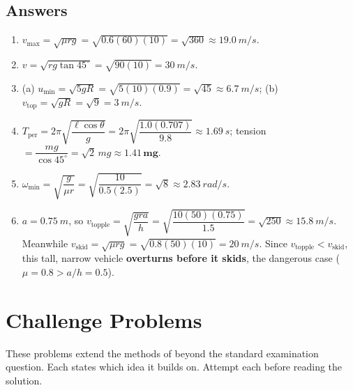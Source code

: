\subsection*{Answers}
{\small
\begin{enumerate}[itemsep=2pt]
\item $v_{\max}=\sqrt{\mu rg}=\sqrt{0.6(60)(10)}=\sqrt{360}\approx\SI{19.0}{m/s}$.
\item $v=\sqrt{rg\tan45^\circ}=\sqrt{90(10)}=\SI{30}{m/s}$.
\item (a) $u_{\min}=\sqrt{5gR}=\sqrt{5(10)(0.9)}=\sqrt{45}\approx\SI{6.7}{m/s}$;
(b) $v_{\text{top}}=\sqrt{gR}=\sqrt{9}=\SI{3}{m/s}$.
\item $T_{\text{per}}=2\pi\sqrt{\dfrac{\ell\cos\theta}{g}}=2\pi\sqrt{\dfrac{1.0(0.707)}{9.8}}
\approx\SI{1.69}{s}$; tension $=\dfrac{mg}{\cos45^\circ}=\sqrt2\,mg\approx\mathbf{1.41\,mg}$.
\item $\omega_{\min}=\sqrt{\dfrac{g}{\mu r}}=\sqrt{\dfrac{10}{0.5(2.5)}}=\sqrt{8}
\approx\SI{2.83}{rad/s}$.
\item $a=\SI{0.75}{m}$, so $v_{\text{topple}}=\sqrt{\dfrac{gra}{h}}
=\sqrt{\dfrac{10(50)(0.75)}{1.5}}=\sqrt{250}\approx\SI{15.8}{m/s}$. Meanwhile
$v_{\text{skid}}=\sqrt{\mu rg}=\sqrt{0.8(50)(10)}=\SI{20}{m/s}$. Since
$v_{\text{topple}}<v_{\text{skid}}$, this tall, narrow vehicle \textbf{overturns before it skids}, the
dangerous case ($\mu=0.8>a/h=0.5$).
\end{enumerate}
}


\section{Challenge Problems}\label{sec:challenge10}
These problems extend the methods of  beyond the standard examination
question. Each states which idea it builds on. Attempt each before reading the solution.


